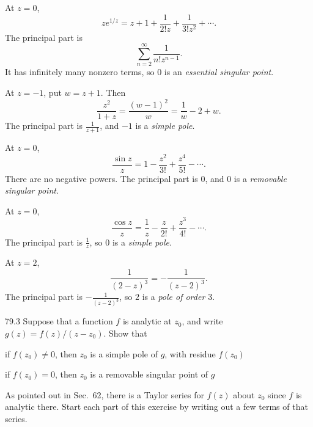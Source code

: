 \documentclass[11pt,oneside]{article}
\begin{document}
\begin{solution}
\begin{exercisesubparts}
    \item At $z=0$,
    \[
        ze^{1/z}=z+1+\frac1{2!z}+\frac1{3!z^2}+\cdots.
    \]
    The principal part is
    \[
        \boxed{\sum_{n=2}^{\infty}\frac1{n!z^{n-1}}}.
    \]
    It has infinitely many nonzero terms, so $0$ is an \emph{essential singular point}.

    \item At $z=-1$, put $w=z+1$. Then
    \[
        \frac{z^2}{1+z}=\frac{(w-1)^2}{w}
        =\frac1w-2+w.
    \]
    The principal part is $\boxed{\frac1{z+1}}$, and $-1$ is a \emph{simple pole}.

    \item At $z=0$,
    \[
        \frac{\sin z}{z}=1-\frac{z^2}{3!}+\frac{z^4}{5!}-\cdots.
    \]
    There are no negative powers. The principal part is $\boxed{0}$, and $0$ is a \emph{removable singular point}.

    \item At $z=0$,
    \[
        \frac{\cos z}{z}=\frac1z-\frac z{2!}+\frac{z^3}{4!}-\cdots.
    \]
    The principal part is $\boxed{\frac1z}$, so $0$ is a \emph{simple pole}.

    \item At $z=2$,
    \[
        \frac1{(2-z)^3}=-\frac1{(z-2)^3}.
    \]
    The principal part is $\boxed{-\frac1{(z-2)^3}}$, so $2$ is a \emph{pole of order $3$}.
\end{exercisesubparts}
\end{solution}

\begin{exercise}{79.3}
Suppose that a function $f$ is analytic at $z_0$, and write $g(z)=f(z)/(z-z_0)$. Show that
\begin{exercisesubparts}
    \item if $f(z_0)\ne0$, then $z_0$ is a simple pole of $g$, with residue $f(z_0)$
    \item if $f(z_0)=0$, then $z_0$ is a removable singular point of $g$
\end{exercisesubparts}
\begin{suggestion}
As pointed out in Sec.~62, there is a Taylor series for $f(z)$ about $z_0$ since $f$ is analytic there. Start each part of this exercise by writing out a few terms of that series.
\end{suggestion}
\end{exercise}
\end{document}
